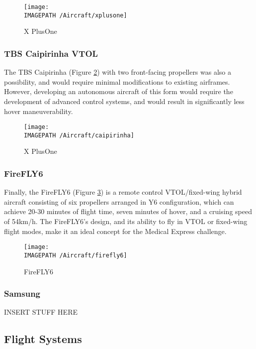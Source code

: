 \begin{figure}[!h]
	\centering
	\texttt{[image: \\IMAGEPATH /Aircraft/xplusone]}
	\caption{X PlusOne}
	\label{fig:xplusone}
\end{figure}

\subsubsection*{TBS Caipirinha VTOL}
The TBS Caipirinha \cite{ref:caipirinha} (Figure \ref{fig:caipirinha}) with two front-facing propellers was also a possibility, and would require minimal modifications to existing airframes. However, developing an autonomous aircraft of this form would require the development of advanced control systems, and would result in significantly less hover maneuverability.

\begin{figure}[!h]
	\centering
	\texttt{[image: \\IMAGEPATH /Aircraft/caipirinha]}
	\caption{X PlusOne}
	\label{fig:caipirinha}
\end{figure}

\subsubsection*{FireFLY6}
Finally, the FireFLY6 \cite{ref:firefly6} (Figure \ref{fig:firefly6}) is a remote control VTOL/fixed-wing hybrid aircraft consisting of six propellers arranged in Y6 configuration, which can achieve 20-30 minutes of flight time, seven minutes of hover, and a cruising speed of 54km/h. The FireFLY6's design, and its ability to fly in VTOL or fixed-wing flight modes, make it an ideal concept for the Medical Express challenge.\\

\begin{figure}[!h]
	\centering
	\texttt{[image: \\IMAGEPATH /Aircraft/firefly6]}
	\caption{FireFLY6}
	\label{fig:firefly6}
\end{figure}

\subsubsection*{Samsung}
INSERT STUFF HERE

\subsection{Flight Systems}
